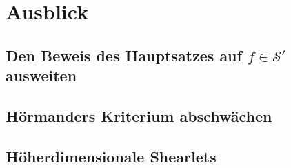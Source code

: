 
\section{Ausblick} %
\label{sec:ausblick}

\subsection{Den Beweis des Hauptsatzes auf $f \in \mathcal{S}'$ ausweiten}

\subsection{Hörmanders Kriterium abschwächen}

\subsection{Höherdimensionale Shearlets}
